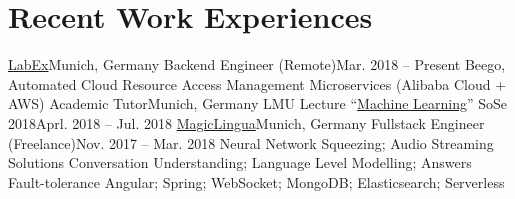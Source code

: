 \section{\textbf{Recent Work Experiences}}
  \resumeSubHeadingListStart
    \resumeSubheading
      {\href{https://labex.io/}{LabEx}}{Munich, Germany}
      {Backend Engineer (Remote)}{Mar. 2018 -- Present}
      \resumeItemListStart
          {Beego, Automated Cloud Resource Access Management Microservices (Alibaba Cloud + AWS)}
      \resumeItemListEnd
    \resumeSubheading
      {Academic Tutor}{Munich, Germany}
      {LMU Lecture ``\href{http://www.dbs.ifi.lmu.de/cms/studium_lehre/lehre_master/ml18/index.html}{Machine Learning}'' SoSe 2018}{Aprl. 2018 -- Jul. 2018}
    \resumeSubheading
    {\href{https://magiclingua.com/}{MagicLingua}}{Munich, Germany}
    {Fullstack Engineer (Freelance)}{Nov. 2017 -- Mar. 2018}
    \resumeItemListStart
        {Neural Network Squeezing; Audio Streaming Solutions}
        {Conversation Understanding; Language Level Modelling; Answers Fault-tolerance}
        {Angular; Spring; WebSocket; MongoDB; Elasticsearch; Serverless}
    \resumeItemListEnd
  \resumeSubHeadingListEnd